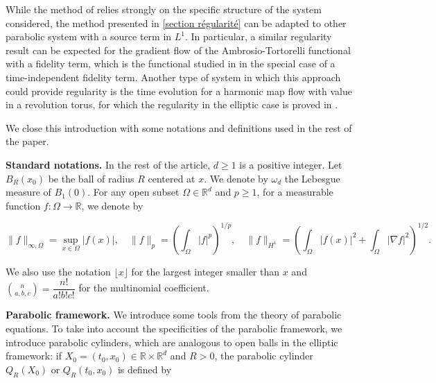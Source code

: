 \documentclass[reqno,12pt,twoside]{amsart}
\numberwithin{equation}{section} \numberwithin{theorem}{section}
\numberwithin{proposition}{section} \numberwithin{lemma}{section}
\numberwithin{corollary}{section}
\numberwithin{definition}{section} \numberwithin{remark}{section}
\begin{document}
\smallskip

While the method of \cite{X94} relies strongly on the specific structure of the system considered, the method presented in \autoref{section régularité} can be adapted to other parabolic system with a source term in $L^1$. In particular, a similar regularity result can be expected for the gradient flow of the Ambrosio-Tortorelli functional with a fidelity term, which is the functional studied in \cite{Cortopassi_2024} in the special case of a time-independent fidelity term. Another type of system in which this approach could provide regularity is the time evolution for a harmonic map flow with value in a revolution torus, for which the regularity in the elliptic case is proved in \cite{R93}.

\smallskip   

We close this introduction with some notations and definitions used in the rest of the paper. 



\medskip

\textbf{Standard notations.}
In the rest of the article, $d\geqslant 1$ is a positive integer. Let $B_R(x_0)$ be the ball of radius $R$ centered at $x$. We denote by $\omega_d$ the Lebesgue measure of $B_1(0)$. For any open subset $\Omega\in \mathbb{R}^d$ and $p\geqslant 1$, for a measurable function $f: \Omega \rightarrow \mathbb{R}$, we denote by 

\[\|f\|_{\infty, \Omega} = \sup_{x\in \Omega} |f(x)|, \quad \|f\|_p = \left(\int_{\Omega} |f|^p\right)^{1/p}, \quad \|f\|_{H^1} = \left(\int_{\Omega} |f(x)|^2 + \int_{\Omega} |\nabla f|^2\right)^{1/2}.\]

We also use the notation $\lfloor x\rfloor$ for the largest integer smaller than $x$ and $\displaystyle\binom{n}{a,b,c} = \dfrac{n!}{a!b!c!}$ for the multinomial coefficient. 

\medskip

\textbf{Parabolic framework.}
We introduce some tools from the theory of parabolic equations. To take into account the specificities of the parabolic framework, we introduce parabolic cylinders, which are analogous to open balls in the elliptic framework: if $X_0=  (t_0, x_0) \in \mathbb{R} \times \mathbb{R}^d$ and $R >0$, the parabolic cylinder $Q_R(X_0)$ or $Q_R(t_0, x_0)$ is defined by
\end{document}
